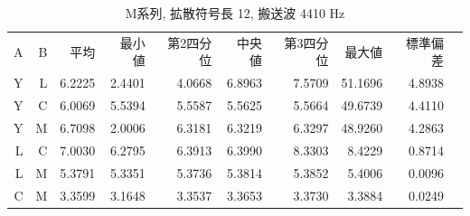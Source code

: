 \begin{table}[p]\centering
  \caption{M系列, 拡散符号長 12, 搬送波 4410 Hz}
  \label{tab:hikaku23}
  \begin{tabular}{rrrrrrrrrr}
    \hline
     A & B & 平均 & 最小値 & 第2四分位 & 中央値 & 第3四分位 & 最大値 & 標準偏差 \\
     Y & L & 6.2225 & 2.4401 & 4.0668 & 6.8963 & 7.5709 & 51.1696 & 4.8938 \\
     Y & C & 6.0069 & 5.5394 & 5.5587 & 5.5625 & 5.5664 & 49.6739 & 4.4110 \\
     Y & M & 6.7098 & 2.0006 & 6.3181 & 6.3219 & 6.3297 & 48.9260 & 4.2863 \\
     L & C & 7.0030 & 6.2795 & 6.3913 & 6.3990 & 8.3303 & 8.4229 & 0.8714 \\
     L & M & 5.3791 & 5.3351 & 5.3736 & 5.3814 & 5.3852 & 5.4006 & 0.0096 \\
     C & M & 3.3599 & 3.1648 & 3.3537 & 3.3653 & 3.3730 & 3.3884 & 0.0249 \\
    \hline
  \end{tabular}
\end{table}




\clearpage


